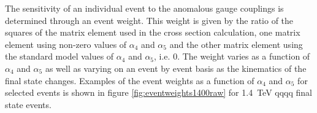 The sensitivity of an individual event to the anomalous gauge couplings is determined through an event weight. This weight is given by the ratio of the squares of the matrix element used in the cross section calculation, one matrix element using non-zero values of $\alpha_{4}$ and $\alpha_{5}$ and the other matrix element using the standard model values of $\alpha_{4}$ and $\alpha_{5}$, i.e. 0.  The weight varies as a function of $\alpha_{4}$ and $\alpha_{5}$ as well as varying on an event by event basis as the kinematics of the final state changes.  Examples of the event weights as a function of $\alpha_{4}$ and $\alpha_{5}$ for selected events is shown in figure \ref{fig:eventweights1400raw} for 1.4~TeV \nu{\nu}qqqq final state events.

\begin{figure}[h!]
\centering
{}
 \hfill
{}

\end{figure}
